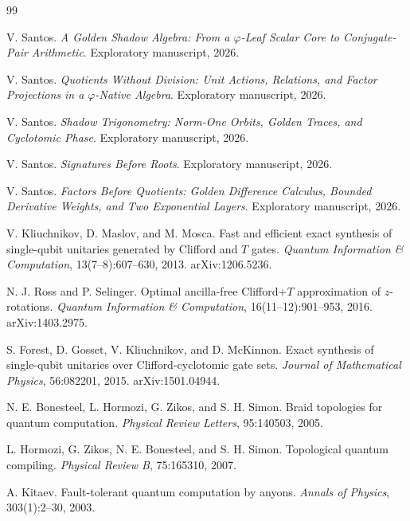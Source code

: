 \documentclass[11pt]{article}
\newcommand{\ph}{\varphi}
\begin{document}
\begin{thebibliography}{99}

V. Santos.
\newblock \emph{A Golden Shadow Algebra: From a $\ph$-Leaf Scalar Core to Conjugate-Pair Arithmetic}.
\newblock Exploratory manuscript, 2026.

V. Santos.
\newblock \emph{Quotients Without Division: Unit Actions, Relations, and Factor Projections in a $\ph$-Native Algebra}.
\newblock Exploratory manuscript, 2026.

V. Santos.
\newblock \emph{Shadow Trigonometry: Norm-One Orbits, Golden Traces, and Cyclotomic Phase}.
\newblock Exploratory manuscript, 2026.

V. Santos.
\newblock \emph{Signatures Before Roots}.
\newblock Exploratory manuscript, 2026.

V. Santos.
\newblock \emph{Factors Before Quotients: Golden Difference Calculus, Bounded Derivative Weights, and Two Exponential Layers}.
\newblock Exploratory manuscript, 2026.

V. Kliuchnikov, D. Maslov, and M. Mosca.
\newblock Fast and efficient exact synthesis of single-qubit unitaries generated by Clifford and $T$ gates.
\newblock \emph{Quantum Information \& Computation}, 13(7--8):607--630, 2013.
\newblock arXiv:1206.5236.

N. J. Ross and P. Selinger.
\newblock Optimal ancilla-free Clifford+$T$ approximation of $z$-rotations.
\newblock \emph{Quantum Information \& Computation}, 16(11--12):901--953, 2016.
\newblock arXiv:1403.2975.

S. Forest, D. Gosset, V. Kliuchnikov, and D. McKinnon.
\newblock Exact synthesis of single-qubit unitaries over Clifford-cyclotomic gate sets.
\newblock \emph{Journal of Mathematical Physics}, 56:082201, 2015.
\newblock arXiv:1501.04944.

N. E. Bonesteel, L. Hormozi, G. Zikos, and S. H. Simon.
\newblock Braid topologies for quantum computation.
\newblock \emph{Physical Review Letters}, 95:140503, 2005.

L. Hormozi, G. Zikos, N. E. Bonesteel, and S. H. Simon.
\newblock Topological quantum compiling.
\newblock \emph{Physical Review B}, 75:165310, 2007.

A. Kitaev.
\newblock Fault-tolerant quantum computation by anyons.
\newblock \emph{Annals of Physics}, 303(1):2--30, 2003.


\end{thebibliography}
\end{document}
